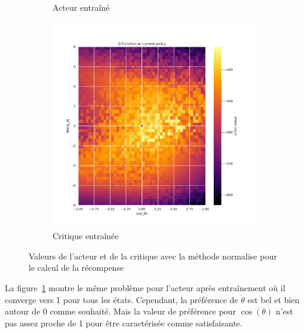 \begin{figure}[H]
\begin{subfigure}{0.3\textwidth}
        \caption{Acteur entraîné}
    \end{subfigure}
    \begin{subfigure}{0.3\textwidth}
        \includegraphics[width=\textwidth]{figures/prelimaire/0_critic_normalize_post_Pendulum-v0.pdf}
        \caption{Critique entraînée}
    \end{subfigure}
    \caption{Valeurs de l'acteur et de la critique avec la méthode normalise pour le calcul de la récompense}
    \label{fig:preli_normalise}
\end{figure}

La figure~\ref{fig:preli_normalise} montre le même problème pour l'acteur après entraînement où il converge vers 1 pour tous les états. Cependant, la préférence de $\dot{\theta}$ est bel et bien autour de 0 comme souhaité. Mais la valeur de préférence pour $\cos(\theta)$ n'est pas assez proche de 1 pour être caractérisée comme satisfaisante.

